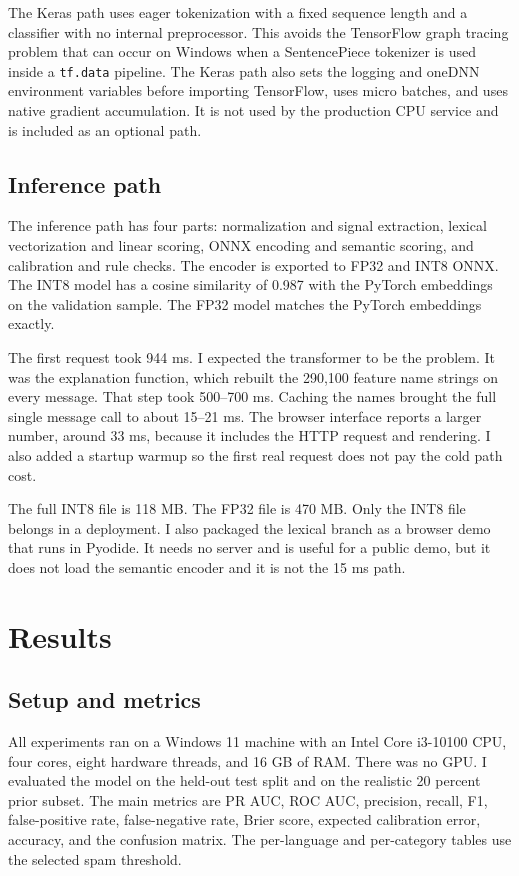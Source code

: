 \documentclass[11pt]{article}
\begin{document}
The Keras path uses eager tokenization with a fixed sequence length and a classifier with no internal preprocessor. This avoids the TensorFlow graph tracing problem that can occur on Windows when a SentencePiece tokenizer is used inside a \texttt{tf.data} pipeline. The Keras path also sets the logging and oneDNN environment variables before importing TensorFlow, uses micro batches, and uses native gradient accumulation. It is not used by the production CPU service and is included as an optional path.

\subsection{Inference path}

The inference path has four parts: normalization and signal extraction, lexical vectorization and linear scoring, ONNX encoding and semantic scoring, and calibration and rule checks. The encoder is exported to FP32 and INT8 ONNX. The INT8 model has a cosine similarity of 0.987 with the PyTorch embeddings on the validation sample. The FP32 model matches the PyTorch embeddings exactly.

The first request took 944 ms. I expected the transformer to be the problem. It was the explanation function, which rebuilt the 290,100 feature name strings on every message. That step took 500--700 ms. Caching the names brought the full single message call to about 15--21 ms. The browser interface reports a larger number, around 33 ms, because it includes the HTTP request and rendering. I also added a startup warmup so the first real request does not pay the cold path cost.

The full INT8 file is 118 MB. The FP32 file is 470 MB. Only the INT8 file belongs in a deployment. I also packaged the lexical branch as a browser demo that runs in Pyodide. It needs no server and is useful for a public demo, but it does not load the semantic encoder and it is not the 15 ms path.

\section{Results}

\subsection{Setup and metrics}

All experiments ran on a Windows 11 machine with an Intel Core i3-10100 CPU, four cores, eight hardware threads, and 16 GB of RAM. There was no GPU. I evaluated the model on the held-out test split and on the realistic 20 percent prior subset. The main metrics are PR AUC, ROC AUC, precision, recall, F1, false-positive rate, false-negative rate, Brier score, expected calibration error, accuracy, and the confusion matrix. The per-language and per-category tables use the selected spam threshold.
\end{document}
